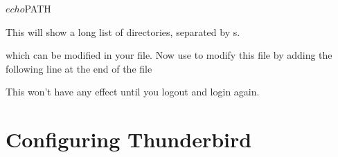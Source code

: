 \begin{ttoutenv}
  $ echo $PATH
\end{ttoutenv}

This will show a long list of directories, separated by \ttout{:}s.

which can be modified in your  file. Now use  to modify this file by adding the following line at the end of the file


This won't have any effect until you logout and login again.

\section{Configuring Thunderbird}

